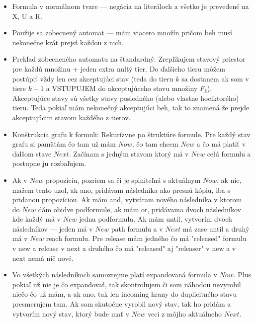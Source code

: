 \documentclass[paper=a4, fontsize=11pt]{scrartcl} %
\numberwithin{equation}{section} %
\numberwithin{figure}{section} %
\numberwithin{table}{section} %
\begin{document}
	\begin{itemize}
		\item Formula v normálnom tvare — negácia na literáloch a všetko je prevedené na X, U a R.
		\item Použije sa zobecnený automat — mám viacero množín pričom beh musí nekonečne krát prejsť každou z nich.
		\item Preklad zobecneného automatu na štandardný: Zreplikujem stavový priestor pre každú množinu + jeden extra nultý tier. Do ďalšieho tieru môžem postúpiť vždy len cez akceptujúci stav (teda do tieru $k$ sa dostanem ak som v tiere $k-1$ a VSTUPUJEM do akceptujúceho stavu množiny $F_k$). Akceptujúce stavy sú všetky stavy posledného (alebo vlastne hociktorého) tieru. Teda pokiaľ mám nekonečný akceptujúci beh, tak to znamená že prejde akceptujúcim stavom každého z tierov.
		
		\item Konštrukcia grafu k formuli: Rekurízvne po štruktúre formule. Pre každý stav grafu si pamätám čo tam už mám $Now$, čo tam chcem $New$ a čo má platiť v ďalšom stave $Next$. Začínam s jedným stavom ktorý má v $New$ celú formulu a postupne ju rozbaľujem.
		
		\item Ak v $New$ propozíciu, pozriem sa či je splniteľná s aktuálnym $Now$, ak nie, mažem tento uzol, ak ano, pridávam následníka ako presnú kópiu, iba s pridanou propozíciou. Ak mám and, vytváram nového následníka v ktorom do $New$ dám obidve podformule, ak mám or, pridávama dvoch následníkov kde každý má v $New$ jednu podformulu. Ak mám until, vytvorím dvoch následníkov — jeden má v $New$ path formulu a v $Next$ má zase until a druhý má v $New$ reach formulu. Pre release mám jedného čo má "released" formulu v new a release v next a druhého čo má "released" aj "releaser" v new a v next nemá nič nové.
		\item Vo všetkých následníkoch samozrejme platí expandovaná formula v $Now$. Plus pokiaľ už nie je čo expandovať, tak skontrolujem či som náhodou nevyrobil niečo čo už mám, a ak ano, tak len incoming hrany do duplicitného stavu presmerujem tam. Ak som skutočne vyrobil nový stav, tak ho pridám a vytvorím nový stav, ktorý bude mať v $New$ veci z môjho aktuálneho $Next$.
	\end{itemize}
	
\end{document}
